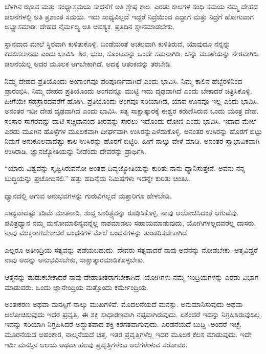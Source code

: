 ಬೆಳಗಿನ ಝಾವ ಮತ್ತು ಸಂಧ್ಯಾಸಮಯ ಸಾಧನೆಗೆ ಅತಿ ಶ್ರೇಷ್ಠ ಕಾಲ. ಎರಡು ಕಾಲಗಳ ಸಂಧಿ ಸಮಯ ನಮ್ಮ ದೇಹದ ಚಲನೆಗಳಲ್ಲಿ ಅತಿ ಪ್ರಶಾಂತ ಸಮಯ. ಇದು ಸಾಧ್ಯವಿಲ್ಲದೆ ಇದ್ದರೆ ನಿದ್ರೆಯಿಂದ ಎದ್ದಾಗ ಮತ್ತು ನಿದ್ರೆಗೆ ಹೋಗುವಾಗ ಅಭ್ಯಾಸಮಾಡಿ. ದೇಹದ ನೈರ್ಮಲ್ಯ ಅತಿ ಆವಶ್ಯಕ. ಪ್ರತಿದಿನ ಸ್ನಾನಮಾಡಬೇಕು.

ಸ್ನಾನವಾದ ಮೇಲೆ ಸ್ಥಿರವಾಗಿ ಕುಳಿತುಕೊಳ್ಳಿ. ಬಂಡೆಯಂತೆ ಅಚಲವಾಗಿ ಕುಳಿತಿರುವೆ, ಯಾವುದೂ ನನ್ನನ್ನು ಕದಲಿಸಲಾರದು ಎಂದು ಭಾವಿಸಿ. ಶಿರ, ಭುಜ, ಸೊಂಟವನ್ನು ಒಂದೇ ಸಮನಾಗಿಡಿ. ಬೆನ್ನು ಮೂಳೆಯನ್ನು ನೇರವಾಗಿಡಿ. ಚಲನೆಯೆಲ್ಲ ಅದರ ಮೂಲಕ ಆಗಬೇಕಾಗಿದೆ. ಅದಕ್ಕೆ ಆತಂಕವನ್ನು ತರಬೇಡಿ.

ನಿಮ್ಮ ದೇಹದ ಪ್ರತಿಯೊಂದು ಅಂಗಾಂಗವೂ ಪರಿಪೂರ್ಣವಾಗಿದೆ ಎಂದು ಭಾವಿಸಿ. ನಿಮ್ಮ ಕಾಲಿನ ಹೆಬ್ಬೆರಳಿನಿಂದ ಪ್ರಾರಂಭಿಸಿ, ನಿಮ್ಮ ದೇಹದ ಪ್ರತಿಯೊಂದು ಅಂಗವನ್ನೂ ಮುಟ್ಟಿ ಇದು ದೃಢವಾಗಿದೆ ಎಂದು ಬೇಕಾದರೆ ಚಿತ್ರಿಸಿಕೊಳ್ಳಿ. ಹೀಗೆಯೇ ಸಹಸ್ರಾರದವರೆಗೆ ಹೋಗಿ. ಪ್ರತಿಯೊಂದು ಅಂಗವೂ ಸರಿಯಾಗಿದೆ, ಯಾವ ಊನವೂ ಇಲ್ಲ ಎಂದು ಭಾವಿಸಿ. ಅನಂತರ ಇಡೀ ದೇಹ ದೃಢವಾಗಿದೆ ಎಂದು ಭಾವಿಸಿ. ಸತ್ಯ ಸಾಕ್ಷಾತ್ಕಾರಕ್ಕೆ ಈಶ್ವರ ಕರುಣಿಸಿರುವ ಒಂದು ಯಂತ್ರ ದೇಹ. ಸಂಸಾರ ಸಾಗರವನ್ನು ದಾಟಿ ಸಚ್ಚಿದಾನಂದ ತೀರವನ್ನು ಸೇರಲು ಇದೊಂದು ದೋಣಿ ಎಂದು ಭಾವಿಸಿ. ಇದಾದ ಮೇಲೆ ಎರಡು ಮೂಗಿನ ಹೊಳ್ಳೆಗಳ ಮೂಲಕವಾಗಿ ದೀರ್ಘವಾಗಿ ಉಸಿರನ್ನು\break ಎಳೆದುಕೊಳ್ಳಿ. ಅನಂತರ ಉಸಿರನ್ನು ಹೊರಗೆ ಬಿಟ್ಟು ನಿಮಗೆ ಅನುಕೂಲವಾದಷ್ಟು ಕಾಲ ಉಸಿರನ್ನು ಹೊರಗೆ ಬಿಟ್ಟಿರಿ. ಹೀಗೆ ನಾಲ್ಕು ವೇಳೆ ಮಾಡಿ. ಅನಂತರ ಸ್ವಾಭಾವಿಕವಾಗಿ ಉಸಿರಾಡಿ, ಜ್ಞಾನಜ್ಯೋತಿಯನ್ನು ನೀಡೆಂದು ದೇವರನ್ನು ಪ್ರಾರ್ಥಿಸಿ.

“ಯಾರು ವಿಶ್ವವನ್ನು ಸೃಷ್ಟಿಸಿರುವನೋ ಅಂತಹ ದಿವ್ಯಜ್ಯೋತಿಯನ್ನು ಕುರಿತು ನಾನು ಧ್ಯಾನಿಸುತ್ತೇನೆ. ಅವನು ನನ್ನ ಬುದ್ಧಿಯನ್ನು ಪ್ರಚೋದಿಸಲಿ.'' ಹತ್ತು ಹದಿನೈದು ನಿಮಿಷಗಳು ಇದನ್ನೇ ಕುರಿತು ಚಿಂತಿಸಿ.

ಧ್ಯಾನದಲ್ಲಿ ಆಗುವ ಅನುಭವಗಳನ್ನು ಗುರುವಿಗಲ್ಲದೆ ಮತ್ತಾರಿಗೂ ಹೇಳಬೇಡಿ.

ಸಾಧ್ಯವಾದಷ್ಟು ಕಡಿಮೆ ಮಾತನಾಡಿ, ಶುದ್ದ ಚಾರಿತ್ರ್ಯವನ್ನು ರೂಢಿಸಿಕೊಳ್ಳಿ. ನಾವು ಆಲೋಚಿಸಿದಂತೆ ಆಗುವೆವು. ಪವಿತ್ರಧ್ಯಾನ ನಮ್ಮ ಮನೋಮಾಲಿನ್ಯವನ್ನೆಲ್ಲ ನಾಶಮಾಡಲು ಸಹಾಯಮಾಡುವುದು, ಯೋಗಿಗಳಲ್ಲದವರೆಲ್ಲ ದಾಸರು. ನಾವು ಮುಕ್ತರಾಗಬೇಕಾದರೆ ಬಂಧನಗಳ ಮೇಲೆ ಬಂಧನಗಳನ್ನು ತುಂಡರಿಸಬೇಕಾಗಿದೆ.

ಎಲ್ಲರೂ ಅತೀಂದ್ರಿಯ ಸತ್ಯವನ್ನು ಪಡೆಯಬಹುದು. ದೇವರು ಸತ್ಯವಾದರೆ ನಾವು ಅವನನ್ನು ನೋಡಬೇಕು. ಆತ್ಮವಿದ್ದರೆ ನಾವು ಅದನ್ನು ಅನುಭವಿಸಬೇಕು, ಸಾಕ್ಷಾತ್ಕಾರಮಾಡಿಕೊಳ್ಳಬೇಕು.

ಆತ್ಮನನ್ನು ಹುಡುಕಬೇಕಾದರೆ ನಾವು ದೇಹಾತೀತರಾಗಬೇಕಾಗಿದೆ. ಯೋಗಿಗಳು ನಮ್ಮ ಇಂದ್ರಿಯಗಳನ್ನು ಎರಡು ವಿಭಾಗ ಮಾಡುವರು. ಒಂದು ಜ್ಞಾನೇಂದ್ರಿಯ ಮತ್ತೊಂದು ಕರ್ಮೇಂದ್ರಿಯ.

ಅಂತಃಕರಣ ಅಥವಾ ಮನಸ್ಸಿಗೆ ನಾಲ್ಕು ಮುಖಗಳಿವೆ. ಮೊದಲನೆಯದೆ ಮನಸ್ಸು. ಅನುಮಾನಿಸುವುದು ಅಥವಾ ಆಲೋಚಿಸುವುದು ಇದರ ಪ್ರವೃತ್ತಿ. ಈ ಶಕ್ತಿ ಸಾಧಾರಣವಾಗಿ ನಷ್ಟವಾಗಿರುವುದು. ಏಕೆಂದರೆ ಇದನ್ನು ನಿಗ್ರಹಿಸಿರುವುದಿಲ್ಲ. ಇದನ್ನು ಸರಿಯಾಗಿ ನಿಗ್ರಹಿಸಿದರೆ ಅದ್ಭುತವಾದ ಶಕ್ತಿ ಕರಗತವಾಗುವುದು. ಎರಡನೆಯದೆ ಬುದ್ದಿ -ಅಂದರೆ ಇಚ್ಛೆ. ಮೂರನೆಯದೆ ಅಹಂಕಾರ, ನಾಲ್ಕನೆಯದೆ ಚಿತ್ತ. ಇತರ ಪ್ರವೃತ್ತಿಗಳೆಲ್ಲ ಇದರ ಮೂಲಕ ಕೆಲಸ ಮಾಡುವುದು. ಇದೇ ಇಡೀ ಮನಸ್ಸಿನ ಆಲಯ ಅಥವಾ ಹಲವು ಪ್ರವೃತ್ತಿಗಳೆಂಬ ಅಲೆಗಳೇಳುವ ಸರೋವರ.

